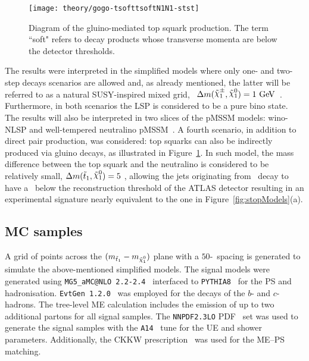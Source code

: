 			\begin{figure}
				\centering\texttt{[image: theory/gogo-tsofttsoftN1N1-stst]}
				\caption{Diagram of the gluino-mediated top squark production. The term ``soft" refers to decay products whose transverse momenta are below the detector thresholds.}
				\label{fig:gtt}
			\end{figure}

			The results were interpreted in the simplified models where only one- and two-step decays scenarios are allowed and, as already mentioned, the latter will be referred to as a natural \ac{SUSY}-inspired mixed grid, \ie\ $\Delta m(\chinoonepm, \ninoone) = 1 \GeV$~\cite{Alwall:2008ve, Alwall:2008ag, Alves:2011wf}. Furthermore, in both scenarios the \ac{LSP} is considered to be a pure bino state. The results will also be interpreted in two slices of the \ac{pMSSM} models: wino-\ac{NLSP} and well-tempered neutralino \ac{pMSSM}~\cite{Djouadi:1998di, Berger:2008cq}.
			A fourth scenario, in addition to direct pair production, was considered: top squarks can also be indirectly produced via gluino decays, as illustrated in Figure~\ref{fig:gtt}. In such model, the mass difference between the top squark and the neutralino is considered to be relatively small, $\Delta m(\stopone, \ninoone) = 5$ \GeV, allowing the jets originating from \stopone\ decay to have a \pt\ below the reconstruction threshold of the \ac{ATLAS} detector resulting in an experimental signature nearly equivalent to the one in Figure~\ref{fig:stopModels}(a).


		\subsection{MC samples}

			A grid of points across the $(\mstopone-\mninoone)$ plane with a $50$-\GeV\ spacing is generated to simulate the above-mentioned simplified models. %
			The signal models were generated using \texttt{MG5\_aMC@NLO 2.2-2.4}~\cite{madgraph} interfaced to \texttt{PYTHIA8}~\cite{pythia8} for the \ac{PS} and hadronisation. \texttt{EvtGen 1.2.0}~\cite{evtGen} was employed for the decays of the  $b$- and $c$-hadrons. The tree-level \ac{ME} calculation includes the emission of up to two additional partons for all signal samples. The \texttt{NNPDF2.3LO} \ac{PDF}~\cite{PDFs} set was used to generate the signal samples with the \verb+A14+~\cite{CT10} tune for the \ac{UE} and shower parameters. Additionally, the \ac{CKKW} prescription~\cite{CKKW} was used for the \ac{ME}–\ac{PS} matching. 


